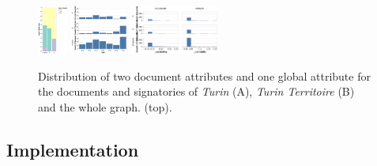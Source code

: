 \begin{figure}
    \centering



    \includegraphics[height=60px]{static/figures/ComBiNet/OriginalPaperFigures/CGF/TurinPlots/type+chantier.pdf}
    \includegraphics[height=60px]{static/figures/ComBiNet/OriginalPaperFigures/CGF/TurinPlots/time.pdf}
    \includegraphics[height=60px]{static/figures/ComBiNet/OriginalPaperFigures/CGF/TurinPlots/centrality.pdf}


    \caption{Distribution of two document attributes and one global attribute for the documents and signatories of \textit{Turin} (A), \textit{Turin Territoire} (B) and the whole graph. (top).}\label{fig:attributeComparison}
\end{figure}


\subsection{Implementation}

